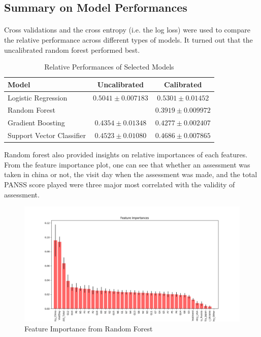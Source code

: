 \documentclass[11pt]{article}
\begin{document}
 	\subsection{Summary on Model Performances}
 	\paragraph{} Cross validations and the cross entropy (i.e. the log loss) were used to compare the relative performance across different types of models. It turned out that the uncalibrated random forest performed best.
 	
 	\begin{table}[H]
 		\centering
 		\begin{tabular}{l|c|c}
 			Model & Uncalibrated & Calibrated \\
 			\hline 
 			Logistic Regression & $0.5041 \pm 0.007183$ & $0.5301 \pm 0.01452$\\
 			Random Forest & \red{$0.3689 \pm 0.008212$} & $0.3919 \pm 0.009972$\\
 			Gradient Boosting & $0.4354 \pm 0.01348$ & $0.4277 \pm 0.002407$\\
 			Support Vector Classifier & $0.4523 \pm 0.01080$ & $0.4686 \pm 0.007865$ \\
 		\end{tabular}
 		\caption{Relative Performances of Selected Models}
 	\end{table}
 	
 	Random forest also provided insights on relative importances of each features. From the feature importance plot, one can see that whether an assessment was taken in china or not, the visit day when the assessment was made, and the total PANSS score played were three major most correlated with the validity of assessment.
 	\begin{figure}[H]
 		\centering
 		\includegraphics[width=0.9\linewidth]{figures/classification_feature_importance.png}
 		\caption{Feature Importance from Random Forest}
 	\end{figure}
 	
\end{document}
